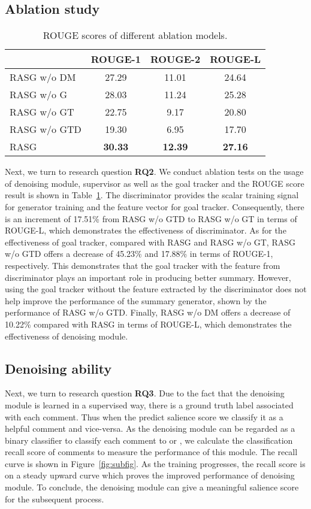 \documentclass[letterpaper]{article} \usepackage{aaai19}  \usepackage{times}  \usepackage{helvet}  \usepackage{courier}
\begin{document}
\subsection{Ablation study}

\begin{table}[t]
\centering
\small
\caption{ROUGE scores of different ablation models.}
\begin{tabular}{@{}lcc c@{}}
\toprule
& ROUGE-1 & ROUGE-2 & ROUGE-L \\
\midrule
RASG w/o DM & 27.29 & 11.01 & 24.64 \\
RASG w/o G & 28.03 & 11.24 & 25.28 \\
RASG w/o GT & 22.75 & 9.17 & 20.80 \\
RASG w/o GTD & 19.30 & 6.95 & 17.70 \\
RASG & \textbf{30.33} & \textbf{12.39} & \textbf{27.16} \\
\bottomrule
\end{tabular}
\label{tab:comp_rouge_ablation}
\end{table}
Next, we turn to research question \textbf{RQ2}.
We conduct ablation tests on the usage of denoising module, supervisor as well as the goal tracker and the ROUGE score result is shown in Table~\ref{tab:comp_rouge_ablation}.
The discriminator provides the scalar training signal  for generator training and the feature vector  for goal tracker.
Consequently, there is an increment of 17.51\% from RASG w/o GTD to RASG w/o GT in terms of ROUGE-L, which demonstrates the effectiveness of discriminator.
As for the effectiveness of goal tracker, compared with RASG and RASG w/o GT, RASG w/o GTD offers a decrease of 45.23\% and 17.88\% in terms of ROUGE-1, respectively. This demonstrates that the goal tracker with the feature from discriminator plays an important role in producing better summary.
However, using the goal tracker without the feature extracted by the discriminator does not help improve the performance of the summary generator, shown by the performance of RASG w/o GTD.
Finally, RASG w/o DM offers a decrease of 10.22\% compared with RASG in terms of ROUGE-L, which demonstrates the effectiveness of denoising module. 

\subsection{Denoising ability}

Next, we turn to research question \textbf{RQ3}.
Due to the fact that the denoising module is learned in a supervised way, there is a ground truth label associated with each comment.
Thus when the predict salience score  we classify it as a helpful comment and vice-versa.
As the denoising module can be regarded as a binary classifier to classify each comment to  or , we calculate the classification recall score of comments to measure the performance of this module.
The recall curve is shown in Figure~\ref{fig:subfig}.
As the training progresses, the recall score is on a steady upward curve which proves the improved performance of denoising module.
To conclude, the denoising module can give a meaningful salience score for the subsequent process.
\end{document}
